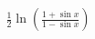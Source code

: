 \documentclass[preview]{standalone}
\begin{document}
\begin{align*}
\frac{1}{2} \ln \left( \frac{1 + \sin{x}}{1 - \sin{x}} \right)
\end{align*}
\end{document}
